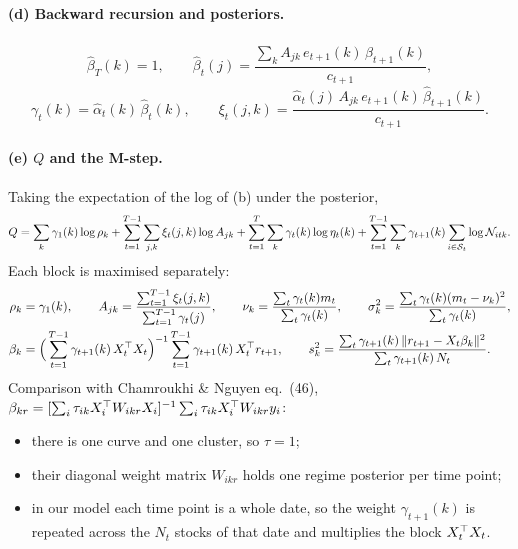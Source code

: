 \paragraph{(d) Backward recursion and posteriors.}
\begin{equation}
\hat\beta_T(k)=1,\qquad\hat\beta_t(j)=\frac{\sum_kA_{jk}\,e_{t+1}(k)\,\hat\beta_{t+1}(k)}{c_{t+1}},
\end{equation}
\begin{equation}
\gamma_t(k)=\hat\alpha_t(k)\,\hat\beta_t(k),\qquad\xi_t(j,k)=\frac{\hat\alpha_t(j)\,A_{jk}\,e_{t+1}(k)\,\hat\beta_{t+1}(k)}{c_{t+1}}.
\end{equation}

\paragraph{(e) $Q$ and the M-step.} Taking the expectation of the log of (b) under the posterior,
\begin{equation}
Q=\sum_k\gamma_1(k)\log\rho_k+\sum_{t=1}^{T-1}\sum_{j,k}\xi_t(j,k)\log A_{jk}+\sum_{t=1}^T\sum_k\gamma_t(k)\log\eta_t(k)+\sum_{t=1}^{T-1}\sum_k\gamma_{t+1}(k)\sum_{i\in\mathcal S_t}\log\mathcal{N}_{itk}.
\end{equation}
Each block is maximised separately:
\begin{align}
\rho_k&=\gamma_1(k),\qquad A_{jk}=\frac{\sum_{t=1}^{T-1}\xi_t(j,k)}{\sum_{t=1}^{T-1}\gamma_t(j)},\qquad\nu_k=\frac{\sum_t\gamma_t(k)m_t}{\sum_t\gamma_t(k)},\qquad\sigma_k^2=\frac{\sum_t\gamma_t(k)(m_t-\nu_k)^2}{\sum_t\gamma_t(k)},\\
\beta_k&=\Big(\sum_{t=1}^{T-1}\gamma_{t+1}(k)\,X_t^{\top} X_t\Big)^{-1}\sum_{t=1}^{T-1}\gamma_{t+1}(k)\,X_t^{\top} r_{t+1},\qquad s_k^2=\frac{\sum_t\gamma_{t+1}(k)\,\|r_{t+1}-X_t\beta_k\|^2}{\sum_t\gamma_{t+1}(k)\,N_t}.
\end{align}
Comparison with Chamroukhi \& Nguyen eq.~(46), $\beta_{kr}=[\sum_i\tau_{ik}X_i^{\top} W_{ikr}X_i]^{-1}\sum_i\tau_{ik}X_i^{\top} W_{ikr}y_i$:
\begin{itemize}
  \item there is one curve and one cluster, so $\tau=1$;
  \item their diagonal weight matrix $W_{ikr}$ holds one regime posterior per time point;
  \item in our model each time point is a whole date, so the weight $\gamma_{t+1}(k)$ is repeated across the $N_t$ stocks of that date and multiplies the block $X_t^{\top} X_t$.
\end{itemize}

